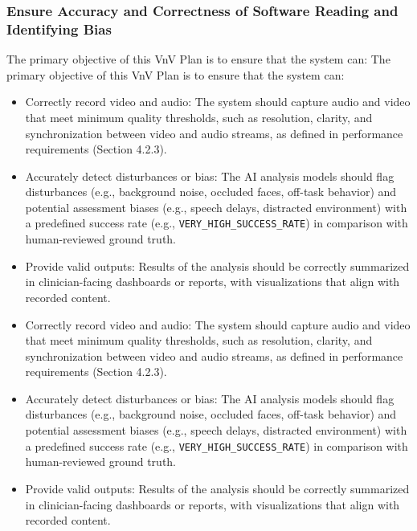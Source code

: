 \documentclass[12pt, titlepage]{article}
\begin{document}
\subsubsection{Ensure Accuracy and Correctness of Software Reading and Identifying Bias}
The primary objective of this VnV Plan is to ensure that the system can:
The primary objective of this VnV Plan is to ensure that the system can:
\begin{itemize}
  \item Correctly record video and audio: The system should capture audio and video that meet minimum quality thresholds, such as resolution, clarity, and synchronization between video and audio streams, as defined in performance requirements (Section 4.2.3).
  \item Accurately detect disturbances or bias: The AI analysis models should flag disturbances (e.g., background noise, occluded faces, off-task behavior) and potential assessment biases (e.g., speech delays, distracted environment) with a predefined success rate (e.g., \texttt{VERY\_HIGH\_SUCCESS\_RATE}) in comparison with human-reviewed ground truth.
  \item Provide valid outputs: Results of the analysis should be correctly summarized in clinician-facing dashboards or reports, with visualizations that align with recorded content.
  \item Correctly record video and audio: The system should capture audio and video that meet minimum quality thresholds, such as resolution, clarity, and synchronization between video and audio streams, as defined in performance requirements (Section 4.2.3).
  \item Accurately detect disturbances or bias: The AI analysis models should flag disturbances (e.g., background noise, occluded faces, off-task behavior) and potential assessment biases (e.g., speech delays, distracted environment) with a predefined success rate (e.g., \texttt{VERY\_HIGH\_SUCCESS\_RATE}) in comparison with human-reviewed ground truth.
  \item Provide valid outputs: Results of the analysis should be correctly summarized in clinician-facing dashboards or reports, with visualizations that align with recorded content.
\end{itemize}
\end{document}
